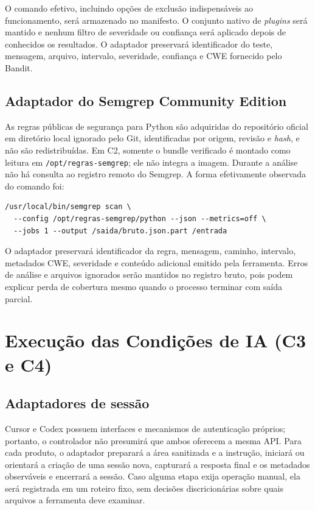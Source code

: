 O comando efetivo, incluindo opções de exclusão indispensáveis ao funcionamento, será armazenado no manifesto. O conjunto nativo de \textit{plugins} será mantido e nenhum filtro de severidade ou confiança será aplicado depois de conhecidos os resultados. O adaptador preservará identificador do teste, mensagem, arquivo, intervalo, severidade, confiança e CWE fornecido pelo Bandit.

\subsection{Adaptador do Semgrep Community Edition}\label{subsec:execucao-semgrep}

As regras públicas de segurança para Python são adquiridas do repositório oficial em diretório local ignorado pelo Git, identificadas por origem, revisão e \textit{hash}, e não são redistribuídas. Em C2, somente o bundle verificado é montado como leitura em \texttt{/opt/regras-semgrep}; ele não integra a imagem. Durante a análise não há consulta ao registro remoto do Semgrep. A forma efetivamente observada do comando foi:

\begin{verbatim}
/usr/local/bin/semgrep scan \
  --config /opt/regras-semgrep/python --json --metrics=off \
  --jobs 1 --output /saida/bruto.json.part /entrada
\end{verbatim}

O adaptador preservará identificador da regra, mensagem, caminho, intervalo, metadados CWE, severidade e conteúdo adicional emitido pela ferramenta. Erros de análise e arquivos ignorados serão mantidos no registro bruto, pois podem explicar perda de cobertura mesmo quando o processo terminar com saída parcial.

\section{Execução das Condições de IA (C3 e C4)}\label{sec:execucao-ia-desenvolvimento}

\subsection{Adaptadores de sessão}\label{subsec:adaptadores-sessao-ia}

Cursor e Codex possuem interfaces e mecanismos de autenticação próprios; portanto, o controlador não presumirá que ambos oferecem a mesma API. Para cada produto, o adaptador preparará a área sanitizada e a instrução, iniciará ou orientará a criação de uma sessão nova, capturará a resposta final e os metadados observáveis e encerrará a sessão. Caso alguma etapa exija operação manual, ela será registrada em um roteiro fixo, sem decisões discricionárias sobre quais arquivos a ferramenta deve examinar.

